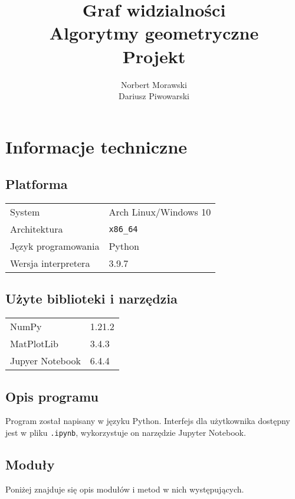 \documentclass[12pt]{article}
\begin{document}
	
	\title{Graf widzialności \\
		\vspace{0.2cm}
		\large Algorytmy geometryczne \\
		\large Projekt}
	\author{Norbert Morawski\\Dariusz Piwowarski}
	
	\maketitle
	\tableofcontents
	\pagebreak
	
	\section{Informacje techniczne}
	\subsection{Platforma}
		\begin{tabular}{l|l}
			System&Arch Linux/Windows 10\\
			Architektura&\texttt{x86\_64}\\
			Język programowania&Python\\
			Wersja interpretera&3.9.7\\
		\end{tabular}

	\subsection{Użyte biblioteki i narzędzia}
		\begin{tabular}{l|l}
			NumPy&1.21.2\\
			MatPlotLib&3.4.3\\
			Jupyer Notebook&6.4.4
		\end{tabular}
	
	\subsection{Opis programu}
		Program został napisany w języku Python. Interfejs dla użytkownika dostępny jest w pliku \lstinline|.ipynb|, wykorzystuje on narzędzie Jupyter Notebook.
	
	\subsection{Moduły}
		Poniżej znajduje się opis modułów i metod w nich występujących.
	
\end{document}
